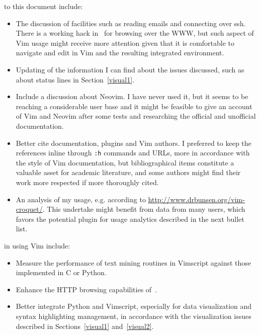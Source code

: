 \documentclass{article}
\newcommand{\tttt}[1]{\texttt{#1}}
\begin{document}
 to this document include:
\begin{itemize}
  \item The discussion of facilities such as reading emails and connecting over ssh.
    There is a working hack in~\cite{vimrc} for browsing over the WWW,
    but such aspect of Vim usage might receive more attention
    given that it is comfortable to navigate and edit in Vim
    and the resulting integrated environment.
  \item Updating of the information I can find about the issues discussed,
    such as about status lines in Section~\ref{visual1}.
  \item Include a discussion about Neovim.
    I have never used it, but it seems to be reaching a considerable user base
    and it might be feasible to give an account of Vim and Neovim
    after some tests and researching the official and unofficial documentation.
  \item Better cite documentation, plugins and Vim authors.
    I preferred to keep the references inline through \tttt{:h} commands
    and URLs, more in accordance with the style of Vim documentation,
    but bibliographical items constitute a valuable asset for academic literature,
    and some authors might find their work more respected if more
    thoroughly cited.
  \item An analysis of my usage, e.g. according to \url{http://www.drbunsen.org/vim-croquet/}.
    This undertake might benefit from data from many users,
    which favors the potential plugin for usage analytics described in the next bullet list.
\end{itemize}

 in using Vim include:
\begin{itemize}
  \item Measure the performance of text mining routines in Vimscript against those implemented in C or Python.
  \item Enhance the HTTP browsing capabilities of~\cite{vimrc}.
  \item Better integrate Python and Vimscript, especially for data visualization
    and syntax highlighting management,
    in accordance with the visualization issues described in
    Sections~\ref{visual1} and~\ref{visual2}.
\end{itemize}
\end{document}
